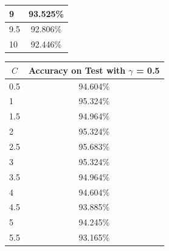 \documentclass[a4paper,10pt,english]{article}
\begin{document}
\begin{minipage}{\textwidth}
\begin{minipage}[b]{0.49\textwidth}
\begin{tabular}{|l|c|}
                9                                & 93.525\%                       \\ \hline
                9.5                              & 92.806\%                       \\ \hline
                10                               & 92.446\%                       \\ \hline
            \end{tabular}
            \label{tab:results_gamma}
        \end{minipage}
        \hfill
        \begin{minipage}[b]{0.49\textwidth}
            \centering
                \begin{tabular}{|l|c|}
                    \hline
                    \multicolumn{1}{|c|}{\textbf{$C$}} & \textbf{Accuracy on Test with $\gamma$ = 0.5} \\ \hline
                    0.5                              & 94.604\%                               \\ \hline
                    1                                & 95.324\%                               \\ \hline
                    1.5                              & 94.964\%                               \\ \hline
                    2                                & 95.324\%                               \\ \hline
                    2.5                              & \cellcolor{green!25} 95.683\%                               \\ \hline
                    3                                & 95.324\%                               \\ \hline
                    3.5                              & 94.964\%                               \\ \hline
                    4                                & 94.604\%                               \\ \hline
                    4.5                              & 93.885\%                               \\ \hline
                    5                                & 94.245\%                               \\ \hline
                    5.5                              & 93.165\%                               \\ \hline

\end{tabular}
\end{minipage}
\end{minipage}
\end{document}
